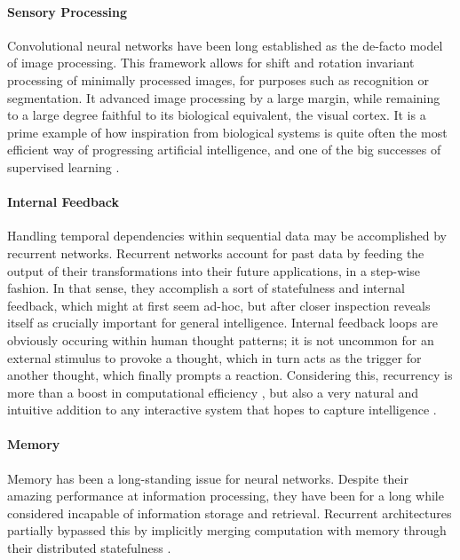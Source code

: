 \documentclass[]{article}
\begin{document}
\paragraph{Sensory Processing} Convolutional neural networks have been long established as the de-facto model of image processing. This framework allows for shift and rotation invariant processing of minimally processed images, for purposes such as recognition or segmentation. It advanced image processing by a large margin, while remaining to a large degree faithful to its biological equivalent, the visual cortex. It is a prime example of how inspiration from biological systems is quite often the most efficient way of progressing artificial intelligence, and one of the big successes of supervised learning \cite{Cichy2016}.

\paragraph{Internal Feedback}
Handling temporal dependencies within sequential data may be accomplished by recurrent networks. Recurrent networks account for past data by feeding the output of their transformations into their future applications, in a step-wise fashion. In that sense, they accomplish a sort of statefulness and internal feedback, which might at first seem ad-hoc, but after closer inspection reveals itself as crucially important for general intelligence. Internal feedback loops are obviously occuring within human thought patterns; it is not uncommon for an external stimulus to provoke a thought, which in turn acts as the trigger for another thought, which finally prompts a reaction. Considering this, recurrency is more than a boost in computational efficiency \cite{SIEGELMANN1995132}, but also a very natural and intuitive addition to any interactive system that hopes to capture intelligence \cite{int}.

\paragraph{Memory}
Memory has been a long-standing issue for neural networks. Despite their amazing performance at information processing, they have been for a long while considered incapable of information storage and retrieval. Recurrent architectures partially bypassed this by implicitly merging computation with memory through their distributed statefulness \cite{Hinton13}. 
\end{document}
